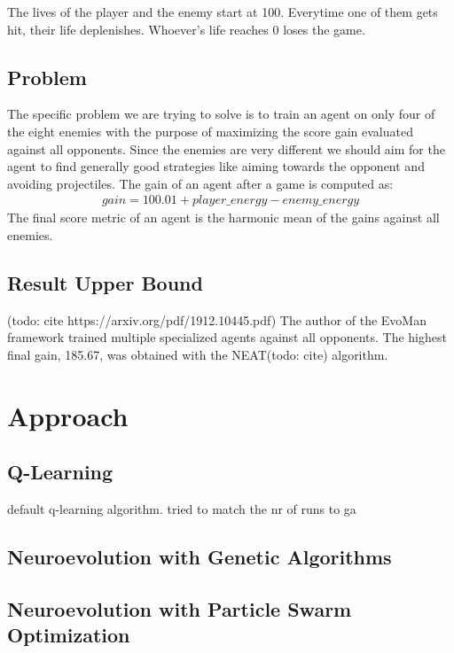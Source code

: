 \documentclass[conference]{IEEEtran}
\begin{document}
    The lives of the player and the enemy start at 100.
    Everytime one of them gets hit, their life deplenishes.
    Whoever's life reaches 0 loses the game.

    \subsection{Problem}\label{subsec:problem}
    The specific problem we are trying to solve is to train an agent on only four of the eight enemies with the purpose
    of maximizing the score gain evaluated against all opponents.
    Since the enemies are very different we should aim for the agent to find generally good strategies like
    aiming towards the opponent and avoiding projectiles.
    The gain of an agent after a game is computed as:
    \begin{gather*}
    gain = 100.01 + player\_energy - enemy\_energy
    \end{gather*}
    The final score metric of an agent is the harmonic mean of the gains against all enemies.

    \subsection{Result Upper Bound}\label{subsec:result-upper-bound}
    (todo: cite https://arxiv.org/pdf/1912.10445.pdf)
    The author of the EvoMan framework trained multiple specialized agents against all opponents.
    The highest final gain, 185.67, was obtained with the NEAT(todo: cite) algorithm.

    \section{Approach}\label{sec:approach}

    \subsection{Q-Learning}\label{subsec:q-learning}
    default q-learning algorithm.
    tried to match the nr of runs to ga
    \subsection{Neuroevolution with Genetic Algorithms}\label{subsec:neuroevolution-with-genetic-algorithms}

    \subsection{Neuroevolution with Particle Swarm Optimization}\label{subsec:neuroevolution-with-particle-swarm-optimization}
\end{document}
